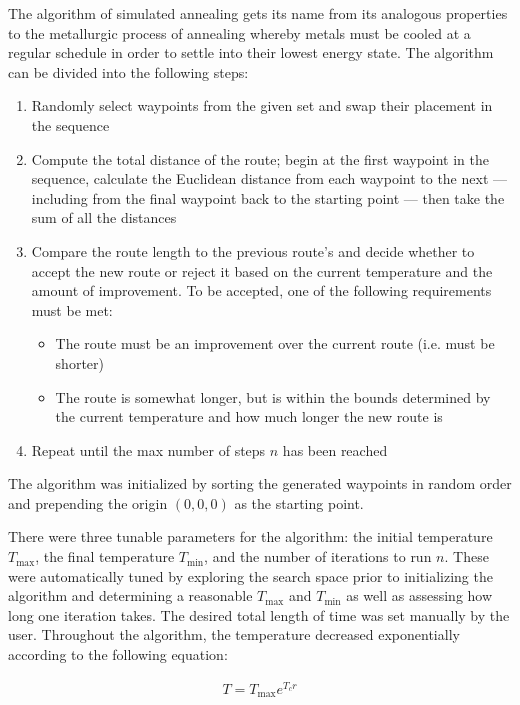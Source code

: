 \documentclass[letterpaper,conference, 10pt]{ieeeconf}
\begin{document}
The algorithm of simulated annealing gets its name from its analogous properties to the metallurgic process of annealing whereby metals must be cooled at a regular schedule in order to settle into their lowest energy state. The algorithm can be divided into the following steps:

\begin{enumerate}
  \item Randomly select waypoints from the given set and swap their placement in the sequence
  \item Compute the total distance of the route; begin at the first waypoint in the sequence, calculate the Euclidean distance from each waypoint to the next --- including from the final waypoint back to the starting point --- then take the sum of all the distances
  \item Compare the route length to the previous route's and decide whether to accept the new route or reject it based on the current temperature and the amount of improvement. To be accepted, one of the following requirements must be met:
    \begin{itemize}
        \item The route must be an improvement over the current route (i.e. must be shorter)
        \item The route is somewhat longer, but is within the bounds determined by the current temperature and how much longer the new route is
    \end{itemize}
  \item Repeat until the max number of steps $n$ has been reached 
\end{enumerate}

The algorithm was initialized by sorting the generated waypoints in random order and prepending the origin $(0,0,0)$ as the starting point. 

There were three tunable parameters for the algorithm: the initial temperature $T_{\text{max}}$, the final temperature $T_\text{min}$, and the number of iterations to run $n$. These were automatically tuned by exploring the search space prior to initializing the algorithm and determining a reasonable $T_{\text{max}}$ and $T_\text{min}$ as well as assessing how long one iteration takes. The desired total length of time was set manually by the user. Throughout the algorithm, the temperature decreased exponentially according to the following equation:

\begin{equation}
\begin{aligned}
  T = T_{\text{max}}e^{T_{c}r} \\
  \label{eq:temp}
  \end{aligned}
\end{equation}
\end{document}
